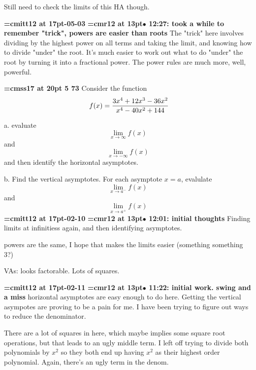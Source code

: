 Still need to check the limits of this HA though.
\par

{\medskip\noindent\bf\font\titlefont=cmitt12 at 17pt-05-03}\medskip
{\smallskip\noindent\bf\font\titlefont=cmr12 at 13pt\titlefont $\bullet$ 12:27: took a while to remember "trick", powers are easier than roots}\smallskip
The "trick" here involves dividing by the highest power on all terms and taking the limit, and knowing how to divide "under" the root. It's much easier to work out what to do "under" the root by turning it into a fractional power. The power rules are much more, well, powerful.
\par

{\medskip\noindent\bf\font\titlefont=cmss17 at 20pt 5 73}\medskip
Consider the function
$$\
f(x) = {
3x^4 + 12x^3 - 36x^2
\over
x^4 - 40x^2 + 144
}
$$
\par a. evaluate $$\lim_{x \to \infty}{f(x)}$$ and
$$\lim_{x \to -\infty}{f(x)}$$ and then identify the horizontal
asymptotes.
\par b. Find the vertical asymptotes. For each asymptote $x = a$,
evalulate $$\lim_{x \to a^{-}}{f(x)}$$ and $$\lim_{x \to a^{+}}{f(x)}$$
{\medskip\noindent\bf\font\titlefont=cmitt12 at 17pt\titlefont 2026-02-10}\medskip
{\smallskip\noindent\bf\font\titlefont=cmr12 at 13pt\titlefont $\bullet$ 12:01: initial thoughts}\smallskip
Finding limits at infinitiess again, and then identifying asymptotes.
\par

powers are the same, I hope that makes the limits easier (something something 3?)
\par

VAs:  looks factorable. Lots of squares.
\par

{\medskip\noindent\bf\font\titlefont=cmitt12 at 17pt-02-11}\medskip
{\smallskip\noindent\bf\font\titlefont=cmr12 at 13pt\titlefont $\bullet$ 11:22: initial work. swing and a miss}\smallskip
horizontal asymptotes are easy enough to do here. Getting the vertical asympotes are proving to be a pain for me. I have been trying to figure out ways to reduce the denominator.
\par

There are a lot of squares in here, which maybe implies some square root operations, but that leads to an ugly middle term. I left off trying to divide both polynomials by $x^2$ so they both end up having $x^2$ as their highest order polynomial. Again, there's an ugly term in the denom.
\par

